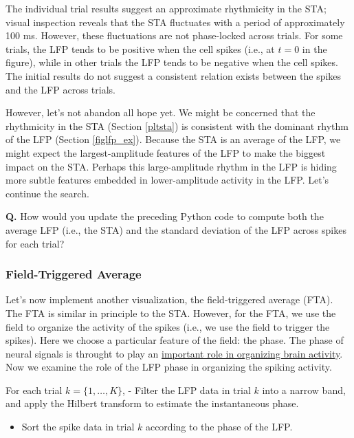 \documentclass[11pt]{article}
\providecommand{\tightlist}{%
      \setlength{\itemsep}{0pt}\setlength{\parskip}{0pt}}
\begin{document}
    The individual trial results suggest an approximate rhythmicity in the
STA; visual inspection reveals that the STA fluctuates with a period of
approximately 100 ms. However, these fluctuations are not phase-locked
across trials. For some trials, the LFP tends to be positive when the
cell spikes (i.e., at \(t = 0\) in the figure), while in other trials
the LFP tends to be negative when the cell spikes. The initial results
do not suggest a consistent relation exists between the spikes and the
LFP across trials.

However, let's not abandon all hope yet. We might be concerned that the
rhythmicity in the STA (Section \ref{pltsta}) is consistent with the
dominant rhythm of the LFP (Section \ref{figlfp_ex}). Because the STA is
an average of the LFP, we might expect the largest-amplitude features of
the LFP to make the biggest impact on the STA. Perhaps this
large-amplitude rhythm in the LFP is hiding more subtle features
embedded in lower-amplitude activity in the LFP. Let's continue the
search.

    \textbf{Q.} How would you update the preceding Python code to compute
both the average LFP (i.e., the STA) and the standard deviation of the
LFP across spikes for each trial?

    \subsubsection{Field-Triggered Average}\label{field-triggered-average}

    Let's now implement another visualization, the field-triggered average
(FTA). The FTA is similar in principle to the STA. However, for the FTA,
we use the field to organize the activity of the spikes (i.e., we use
the field to trigger the spikes). Here we choose a particular feature of
the field: the phase. The phase of neural signals is throught to play an
\href{https://www.ncbi.nlm.nih.gov/pmc/articles/PMC4605134/}{important
role in organizing brain activity}. Now we examine the role of the LFP
phase in organizing the spiking activity.

For each trial \(k = \{1, \ldots, K\}\), - Filter the LFP data in trial
\(k\) into a narrow band, and apply the Hilbert transform to estimate
the instantaneous phase.

\begin{itemize}
\tightlist
\item
  Sort the spike data in trial \(k\) according to the phase of the LFP.
\end{itemize}
\end{document}
